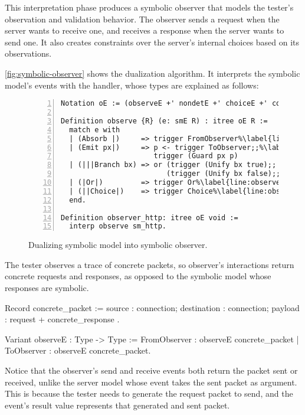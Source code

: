 This interpretation phase produces a symbolic observer that models the tester's
observation and validation behavior.  The observer sends a request when the
server wants to receive one, and receives a response when the server wants to
send one.  It also creates constraints over the server's internal choices based
on its observations.

\autoref{fig:symbolic-observer} shows the dualization algorithm.  It interprets
the symbolic model's events with the  handler, whose types are
explained as follows:

\begin{figure}
\begin{lstlisting}[numbers=left]
Notation oE := (observeE +' nondetE +' choiceE +' constraintE).

Definition observe {R} (e: smE R) : itree oE R :=
  match e with
  | (Absorb |)     => trigger FromObserver%\label{line:observe-absorb}%
  | (Emit px|)     => p <- trigger ToObserver;;%\label{line:observe-emit}%
                      trigger (Guard px p)
  | (|||Branch bx) => or (trigger (Unify bx true);;  ret true)%\label{line:observe-branch}%
                         (trigger (Unify bx false);; ret false)
  | (|Or|)         => trigger Or%\label{line:observe-or}%
  | (||Choice|)    => trigger Choice%\label{line:observe-choice}%
  end.

Definition observer_http: itree oE void :=
  interp observe sm_http.
\end{lstlisting}
\caption{Dualizing symbolic model into symbolic observer.}
\label{fig:symbolic-observer}
\end{figure}

The tester observes a trace of concrete packets, so observer's interactions
return concrete requests and responses, as opposed to the symbolic model whose
responses are symbolic.
\begin{coq}
  Record concrete_packet := {
    source      : connection;
    destination : connection;
    payload     : request + concrete_response
  }.

  Variant observeE : Type -> Type :=
    FromObserver   : observeE concrete_packet
  | ToObserver     : observeE concrete_packet.
\end{coq}

Notice that the observer's send and receive events both return the packet sent
or received, unlike the server model whose  event takes the sent
packet as argument.  This is because the tester needs to generate the request
packet to send, and the event's result value represents that generated and sent
packet.

